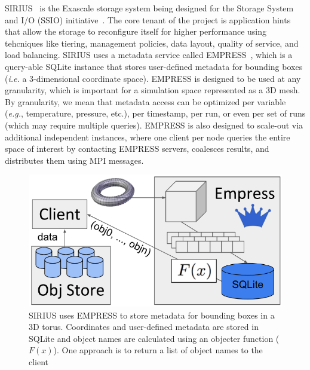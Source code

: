 SIRIUS~\cite{klasky:journal16-sirius} is the Exascale storage system being
designed for the Storage System and I/O (SSIO)
initiative~\cite{ross:report14-ssio}. The core tenant of the project is
application hints that allow the storage to reconfigure itself for higher
performance using tehcniques like tiering, management policies, data layout,
quality of service, and load balancing.  SIRIUS uses a metadata service called
EMPRESS~\cite{lawson:pdsw17-empress}, which is a query-able SQLite instance
that stores user-defined metadata for bounding boxes ({\it i.e.} a
3-dimensional coordinate space).  EMPRESS is designed to be used at any
granularity, which is important for a simulation space represented as a 3D
mesh. By granularity, we mean that metadata access can be optimized per
variable ({\it e.g.}, temperature, pressure, etc.), per timestamp, per run, or
even per set of runs (which may require multiple queries).  EMPRESS is also
designed to scale-out via additional independent instances, where one client
per node queries the entire space of interest by contacting EMPRESS servers,
coalesces results, and distributes them using MPI messages.


\begin{figure}[tb]
\centering
  \includegraphics[width=0.8\linewidth]{figures/empress.png}
  \caption{SIRIUS uses EMPRESS to store metadata for bounding boxes in a 3D
torus. Coordinates and user-defined metadata are stored in SQLite and object
names are calculated using an objecter function (\(F(x)\)). One approach is to
return a list of object names to the client}
  \label{fig:empress}
\end{figure}

